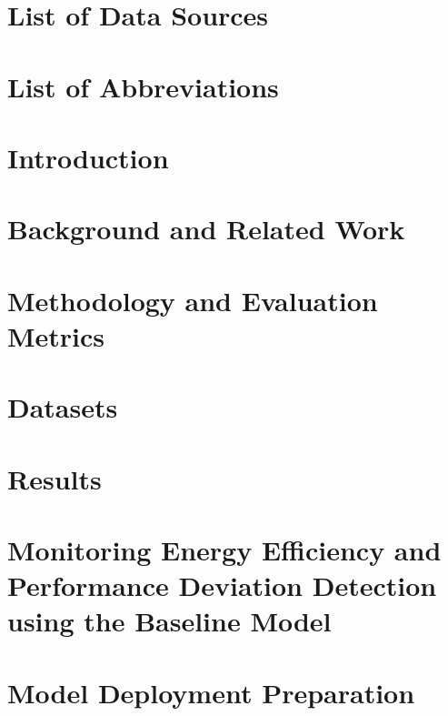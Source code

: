 \documentclass[12pt, letterpaper]{article}
\begin{document}



\pagebreak

\tableofcontents
\pagebreak
\listoffigures
\listoftables
\pagebreak

\section*{List of Data Sources}

\pagebreak

\section*{List of Abbreviations}

\pagebreak

\section{Introduction}

\pagebreak

\section{Background and Related Work}

\pagebreak

\section{Methodology and Evaluation Metrics}

\pagebreak

\section{Datasets}

\pagebreak

\section{Results}

\pagebreak

\section{Monitoring Energy Efficiency and Performance Deviation Detection using the Baseline Model}

\pagebreak

\section{Model Deployment Preparation}

\pagebreak
\end{document}
